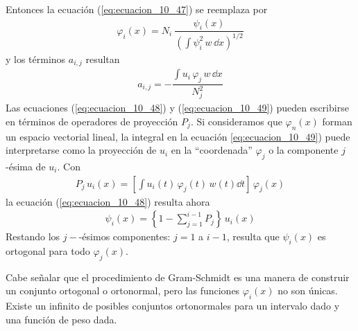 Entonces la ecuación (\ref{eq:ecuacion_10_47}) se reemplaza por
\begin{align}
\varphi_{i}(x) =  N_{i} \: \dfrac{\psi_{i}(x)}{\left( \displaystyle \int \psi_{i}^{2} \, w \, \dd{x} \right)^{1/2}}
\label{eq:ecuacion_10_47a}
\end{align}
y los términos $a_{i,j}$ resultan
\begin{align}
a_{i, j} = - \dfrac{ \displaystyle \int u_{i} \, \varphi_{j} \, w \, \dd{x}}{N_{j}^{2}}
\label{eq:ecuacion_10_49a}
\end{align}
Las ecuaciones (\ref{eq:ecuacion_10_48}) y (\ref{eq:ecuacion_10_49}) pueden escribirse en términos de operadores de proyección $P_{j}$. Si consideramos que $\varphi_{n}(x)$ forman un espacio vectorial lineal, la integral en la ecuación \ref{eq:ecuacion_10_49}) puede interpretarse como la proyección de $u_{i}$ en la \enquote{coordenada} $\varphi_{j}$ o la componente $j$-ésima de $u_{i}$. Con
\begin{align*}
P_{j} \, u_{i}(x) = \left[ \int u_{i}(t) \, \varphi_{j}(t) \, w(t) \dd{t} \right]\, \varphi_{j}(x)
\end{align*}
la ecuación (\ref{eq:ecuacion_10_48}) resulta ahora
\begin{align}
\psi_{i}(x) = \left\{ 1 - \sum_{j=1}^{i-1} P_{j} \right\} \, u_{i}(x)
\label{eq:ecuacion_10_48a}
\end{align}
Restando los $j-$-ésimos componentes: $j=1$ a $i-1$, resulta que $\psi_{i}(x)$ es ortogonal para todo $\varphi_{j}(x)$.
\par
 Cabe señalar que el procedimiento de Gram-Schmidt es una manera de construir un conjunto ortogonal o ortonormal, pero las funciones $\varphi_{i}(x)$ no son únicas. Existe un infinito de posibles conjuntos ortonormales para un intervalo dado y una función de peso dada.

